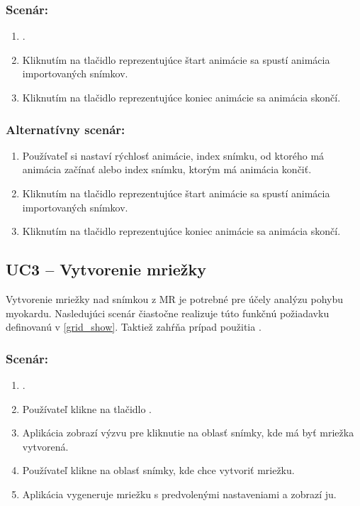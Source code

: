 {\subsubsection*{Scenár:}
\begin {enumerate}
\item {.}
\item {Kliknutím na tlačidlo reprezentujúce štart animácie sa spustí animácia importovaných snímkov.}
\item {Kliknutím na tlačidlo reprezentujúce koniec animácie sa animácia skončí.}
\end {enumerate}

\subsubsection*{Alternatívny scenár:}
\begin {enumerate}
\item [\textbf{2.}] {Používateľ si nastaví rýchlosť animácie, index snímku, od ktorého má animácia začínať alebo index snímku, ktorým má animácia končiť.}
\item  [\textbf{3.}] {Kliknutím na tlačidlo reprezentujúce štart animácie sa spustí animácia importovaných snímkov.}
\item  [\textbf{4.}] {Kliknutím na tlačidlo reprezentujúce koniec animácie sa animácia skončí.}
\end {enumerate}

\subsection {UC3 -- Vytvorenie mriežky}\label{uc3}
Vytvorenie mriežky nad snímkou z MR je potrebné pre účely analýzu pohybu myokardu. Nasledujúci scenár čiastočne realizuje túto funkčnú požiadavku definovanú v \ref{grid_show}. Taktiež zahŕňa prípad použitia .

\subsubsection*{Scenár:}
\begin {enumerate}
\item {.}
\item {Používateľ klikne na tlačidlo .}
\item {Aplikácia zobrazí výzvu pre kliknutie na oblasť snímky, kde má byť mriežka vytvorená.}
\item {Používateľ klikne na oblasť snímky, kde chce vytvoriť mriežku.}
\item {Aplikácia vygeneruje mriežku s predvolenými nastaveniami a zobrazí ju.}
\end {enumerate}

}
